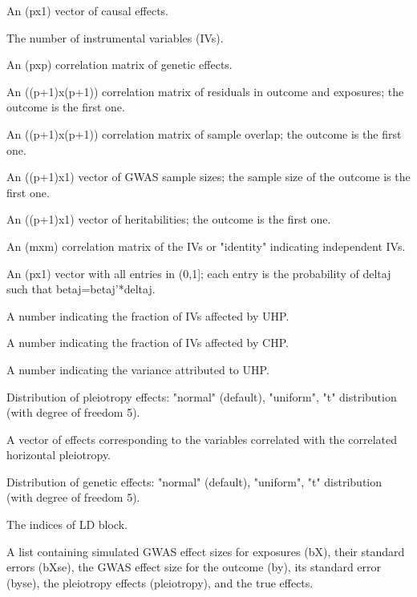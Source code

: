 \documentclass[a4paper]{book}
\begin{document}
\begin{Arguments}
\begin{ldescription}
\item[\code{theta}] An (px1) vector of causal effects.

\item[\code{m}] The number of instrumental variables (IVs).

\item[\code{Rbb}] An (pxp) correlation matrix of genetic effects.

\item[\code{Ruv}] An ((p+1)x(p+1)) correlation matrix of residuals in outcome and exposures; the outcome is the first one.

\item[\code{Rnn}] An ((p+1)x(p+1)) correlation matrix of sample overlap; the outcome is the first one.

\item[\code{Nxy}] An ((p+1)x1) vector of GWAS sample sizes; the sample size of the outcome is the first one.

\item[\code{Hxy}] An ((p+1)x1) vector of heritabilities; the outcome is the first one.

\item[\code{LD}] An (mxm) correlation matrix of the IVs or "identity" indicating independent IVs.

\item[\code{non.zero.frac}] An (px1) vector with all entries in (0,1]; each entry is the probability of deltaj such that betaj=betaj'*deltaj.

\item[\code{UHP.frac}] A number indicating the fraction of IVs affected by UHP.

\item[\code{CHP.frac}] A number indicating the fraction of IVs affected by CHP.

\item[\code{UHP.var}] A number indicating the variance attributed to UHP.

\item[\code{UHP.dis}] Distribution of pleiotropy effects: "normal" (default), "uniform",  "t" distribution (with degree of freedom 5).

\item[\code{CHP.effect}] A vector of effects corresponding to the variables correlated with the correlated horizontal pleiotropy.

\item[\code{effect.dis}] Distribution of genetic effects: "normal" (default), "uniform",  "t" distribution (with degree of freedom 5).

\item[\code{cluster.index}] The indices of LD block.
\end{ldescription}
\end{Arguments}
%
\begin{Value}
A list containing simulated GWAS effect sizes for exposures (bX), their standard errors (bXse),
the GWAS effect size for the outcome (by), its standard error (byse), the pleiotropy effects (pleiotropy), and the true effects.
\end{Value}
\printindex{}
\end{document}
